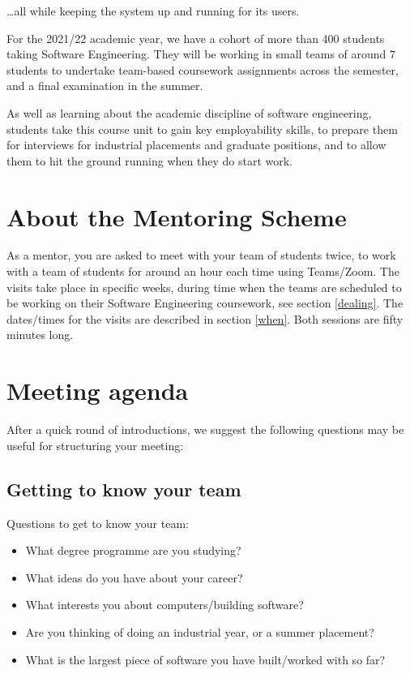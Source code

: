 \documentclass[
]{book}
\providecommand{\tightlist}{%
  \setlength{\itemsep}{0pt}\setlength{\parskip}{0pt}}
\begin{document}
\ldots all while keeping the system up and running for its users.

For the 2021/22 academic year, we have a cohort of more than 400 students taking Software Engineering. They will be working in small teams of around 7 students to undertake team-based coursework assignments across the semester, and a final examination in the summer.

As well as learning about the academic discipline of software engineering, students take this course unit to gain key employability skills, to prepare them for interviews for industrial placements and graduate positions, and to allow them to hit the ground running when they do start work.

\hypertarget{mentoringscheme}{%
\section{About the Mentoring Scheme}\label{mentoringscheme}}

As a mentor, you are asked to meet with your team of students twice, to work with a team of students for around an hour each time using Teams/Zoom. The visits take place in specific weeks, during time when the teams are scheduled to be working on their Software Engineering coursework, see section \ref{dealing}. The dates/times for the visits are described in section \ref{when}. Both sessions are fifty minutes long.

\hypertarget{agenda}{%
\section{Meeting agenda}\label{agenda}}

After a quick round of introductions, we suggest the following questions may be useful for structuring your meeting:

\hypertarget{teambuilding}{%
\subsection{Getting to know your team}\label{teambuilding}}

Questions to get to know your team:

\begin{itemize}
\tightlist
\item
  What degree programme are you studying?
\item
  What ideas do you have about your career?
\item
  What interests you about computers/building software?
\item
  Are you thinking of doing an industrial year, or a summer placement?
\item
  What is the largest piece of software you have built/worked with so far?
\end{itemize}
\end{document}
